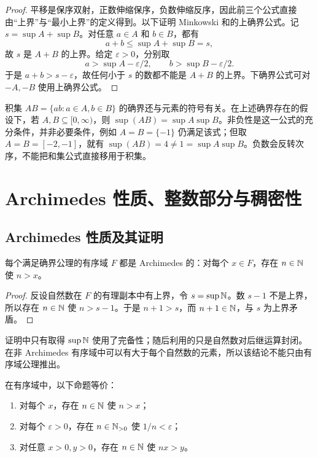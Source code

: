\begin{proof}
平移是保序双射，正数伸缩保序，负数伸缩反序，因此前三个公式直接由“上界”与“最小上界”的定义得到。以下证明 Minkowski 和的上确界公式。记 \(s=\sup A+\sup B\)。对任意 \(a\in A\) 和 \(b\in B\)，都有
\[
 a+b\le \sup A+\sup B=s,
\]
故 \(s\) 是 \(A+B\) 的上界。给定 \(\varepsilon>0\)，分别取
\[
  a>\sup A-\varepsilon/2,\qquad
  b>\sup B-\varepsilon/2.
\]
于是 \(a+b>s-\varepsilon\)，故任何小于 \(s\) 的数都不能是 \(A+B\) 的上界。下确界公式可对 \(-A,-B\) 使用上确界公式。
\end{proof}

积集 \(AB=\{ab:a\in A,b\in B\}\) 的确界还与元素的符号有关。在上述确界存在的假设下，若 \(A,B\subseteq[0,\infty)\)，则 \(\sup(AB)=\sup A\sup B\)。非负性是这一公式的充分条件，并非必要条件，例如 \(A=B=\{-1\}\) 仍满足该式；但取 \(A=B=[-2,-1]\)，就有 \(\sup(AB)=4\ne1=\sup A\sup B\)。负数会反转次序，不能把和集公式直接移用于积集。

\section{Archimedes 性质、整数部分与稠密性}

\subsection{Archimedes 性质及其证明}


\begin{theorem}[Archimedes 性质]
每个满足确界公理的有序域 \(F\) 都是 Archimedes 的：对每个 \(x\in F\)，存在 \(n\in\mathbb{N}\) 使 \(n>x\)。
\end{theorem}

\begin{proof}
反设自然数在 \(F\) 的有理副本中有上界，令 \(s=\sup\mathbb{N}\)。数 \(s-1\) 不是上界，所以存在 \(n\in\mathbb{N}\) 使 \(n>s-1\)。于是 \(n+1>s\)，而 \(n+1\in\mathbb{N}\)，与 \(s\) 为上界矛盾。
\end{proof}

证明中只有取得 \(\sup\mathbb{N}\) 使用了完备性；随后利用的只是自然数对后继运算封闭。在非 Archimedes 有序域中可以有大于每个自然数的元素，所以该结论不能只由有序域公理推出。

\begin{proposition}
在有序域中，以下命题等价：
\begin{enumerate}
 \item 对每个 \(x\)，存在 \(n\in\mathbb{N}\) 使 \(n>x\)；
 \item 对每个 \(\varepsilon>0\)，存在 \(n\in\mathbb{N}_{>0}\) 使 \(1/n<\varepsilon\)；
 \item 对任意 \(x>0,y>0\)，存在 \(n\in\mathbb{N}\) 使 \(nx>y\)。
\end{enumerate}
\end{proposition}

